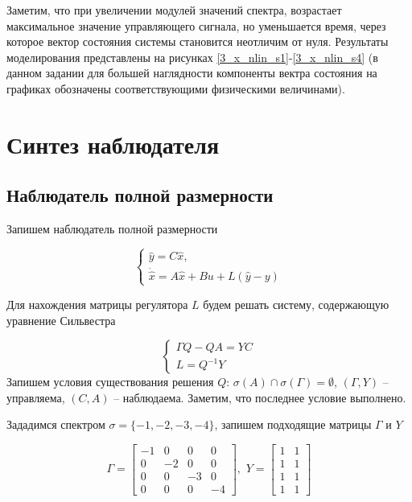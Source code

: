 Заметим, что при увеличении модулей значений спектра, возрастает максимальное значение управляющего сигнала, но уменьшается время, через которое вектор состояния системы становится неотличим от нуля. Результаты моделирования представлены на рисунках \ref{3_x_nlin_s1}-\ref{3_x_nlin_s4} (в данном задании для большей наглядности компоненты вектра состояния на графиках обозначены соответствующими физическими величинами).

\section{Синтез наблюдателя}

\subsection{Наблюдатель полной размерности}
Запишем наблюдатель полной размерности

\begin{equation}
    \begin{cases}
        \hat{y} = C \hat{x},\\
        \dot{\hat{x}} = A \hat{x} + Bu + L( \hat{y} - y)
    \end{cases}
\end{equation}


Для нахождения матрицы регулятора $L$ будем решать систему, содержающую уравнение Сильвестра

\begin{equation}
    \label{3_sil_obs}
    \begin{cases}
        \Gamma Q - Q A = YC\\
        L = Q^{-1}Y
    \end{cases}
\end{equation}
Запишем условия существования решения $Q$: $\sigma(A) \cap \sigma(\Gamma) = \emptyset$, $(\Gamma,Y)$ -- управляема, $(C, A)$ -- наблюдаема. Заметим, что последнее условие выполнено. 

Зададимся спектром $\sigma = \{ -1, -2, -3, -4  \}$, запишем подходящие матрицы $\Gamma$ и $Y$

\begin{equation}
\Gamma=
    \begin{bmatrix}
    -1	&0	&0	&0\\
0	&-2	&0	&0\\
0	&0&	-3	&0\\
0	&0	&0	&-4
\end{bmatrix}, \, \, 
Y  = \begin{bmatrix}
    1 & 1\\
    1 & 1\\
    1 & 1\\
    1 & 1
\end{bmatrix}
\end{equation}

